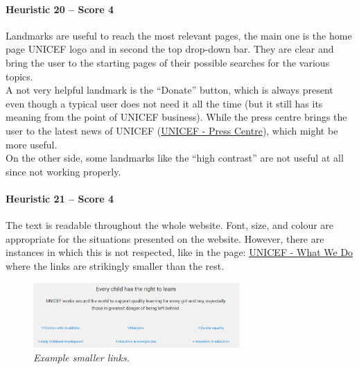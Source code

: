 \paragraph*{Heuristic 20 – Score 4}
Landmarks are useful to reach the most relevant pages, the main one is the home page UNICEF logo and in second the top drop-down bar. They are clear and bring the user to the starting pages of their possible searches for the various topics.\\
A not very helpful landmark is the “Donate” button, which is always present even though a typical user does not need it all the time (but it still has its meaning from the point of UNICEF business). While the press centre brings the user to the latest news of UNICEF (\href{https://www.unicef.org/media/press-centre}{UNICEF - Press Centre}), which might be more useful.\\
On the other side, some landmarks like the “high contrast” are not useful at all since not working properly.

\paragraph*{Heuristic 21 – Score 4}
The text is readable throughout the whole website. Font, size, and colour are appropriate for the situations presented on the website.
However, there are instances in which this is not respected, like in the page: \href{https://www.unicef.org/what-we-do}{UNICEF - What We Do} where the links are strikingly smaller than the rest.
\begin{figure}[h]
	\centering
	\begin{center}
		\includegraphics[width=0.7\textwidth]{Picture21.png}
	\end{center}
	\captionsetup{font=small}
	\caption{\textit{Example smaller links.}}
	\label{fig:label21}
\end{figure}

